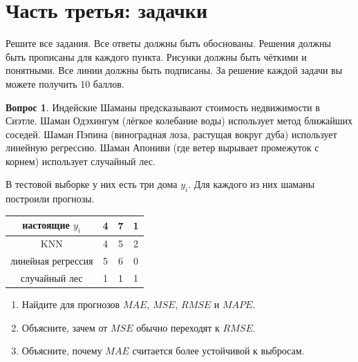\documentclass[12pt]{article}
\theoremstyle{definition}
\newtheorem{question}{Вопрос}
\begin{document}
\newpage 


\section*{Часть третья: задачки}

Решите все задания. Все ответы должны быть обоснованы. Решения должны быть прописаны для каждого пункта. Рисунки должны быть чёткими и понятными. Все линии должны быть подписаны. За решение каждой задачи вы можете получить 10 баллов.

\begin{question}
Индейские Шаманы предсказывают стоимость недвижимости в Сиэтле.  Шаман Одэхингум (лёгкое колебание воды) использует метод ближайших соседей. Шаман Пэпина (виноградная лоза, растущая вокруг дуба) использует линейную регрессию. Шаман Апониви (где ветер вырывает промежуток с корнем) использует случайный лес. 

В тестовой выборке у них есть три дома $y_i$. Для каждого из них шаманы построили прогнозы. 

\begin{center}
  \begin{tabular}{c|c|c|c}
    настоящие $y_i$ &  4 & 7 & 1 \\
    \hline
    KNN & 4 & 5 & 2  \\
    линейная регрессия &  5 & 6 & 0 \\
    случайный лес & 1 & 1 & 1 \\
  \end{tabular}
\end{center}

\begin{enumerate}
    \item Найдите для прогнозов $MAE$, $MSE$, $RMSE$ и $MAPE$.
    \item Объясните, зачем от $MSE$ обычно переходят к $RMSE$.
    \item Объясните, почему $MAE$ считается более устойчивой к выбросам.
\end{enumerate}
\end{question}

\newpage 
\end{document}
